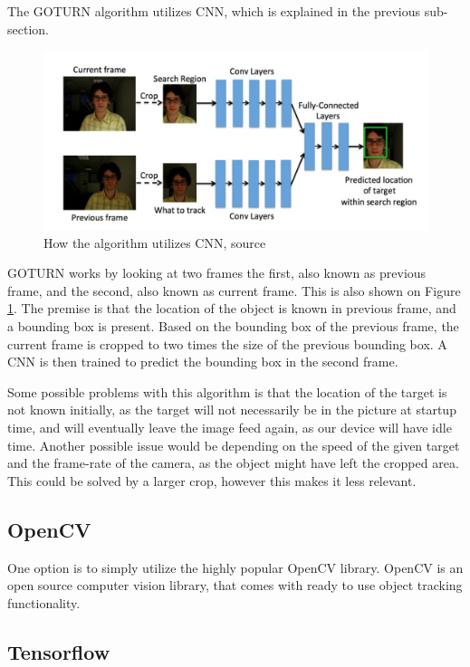 The GOTURN algorithm utilizes CNN, which is explained in the previous sub-section.
\begin{figure}[H]
	\centering
	\includegraphics[scale=0.80]{images/GOTURN-architecture.jpg}
	\caption{
		How the algorithm utilizes CNN, source \cite{goturn}
	}
	\label{fig:goturn-arch}
\end{figure}
GOTURN works by looking at two frames the first, also known as previous frame, and the second, also known as current frame.
This is also shown on Figure \ref{fig:goturn-arch}.
The premise is that the location of the object is known in previous frame, and a bounding box is present.
Based on the bounding box of the previous frame, the current frame is cropped to two times the size of the previous bounding box.
A CNN is then trained to predict the bounding box in the second frame.


Some possible problems with this algorithm is that the location of the target is not known initially, as the target will not necessarily be in the picture at startup time, and will eventually leave the image feed again, as our device will have idle time.
Another possible issue would be depending on the speed of the given target and the frame-rate of the camera, as the object might have left the cropped area. 
This could be solved by a larger crop, however this makes it less relevant.

\subsection{OpenCV}
One option is to simply utilize the highly popular OpenCV library.
OpenCV is an open source computer vision library, that comes with ready to use object tracking functionality.



\subsection{Tensorflow}



